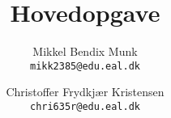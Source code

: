 \documentclass[a4paper, 11pt, danish]{report}
\title{Hovedopgave}
\author{
    Mikkel Bendix Munk\\
    \texttt{mikk2385@edu.eal.dk}
    \and
    Christoffer Frydkjær Kristensen\\
    \texttt{chri635r@edu.eal.dk}
}
\begin{document}
\maketitle
\tableofcontents{}
\newpage






\end{document}
